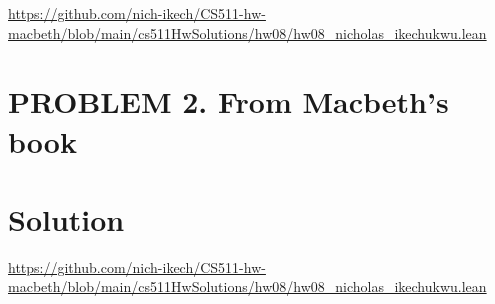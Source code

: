 \documentclass{article}
\begin{document}
\url{https://github.com/nich-ikech/CS511-hw-macbeth/blob/main/cs511HwSolutions/hw08/hw08_nicholas_ikechukwu.lean}

\newpage

\section*{PROBLEM 2. From Macbeth's book}
\section*{Solution}

\url{https://github.com/nich-ikech/CS511-hw-macbeth/blob/main/cs511HwSolutions/hw08/hw08_nicholas_ikechukwu.lean}
\end{document}

